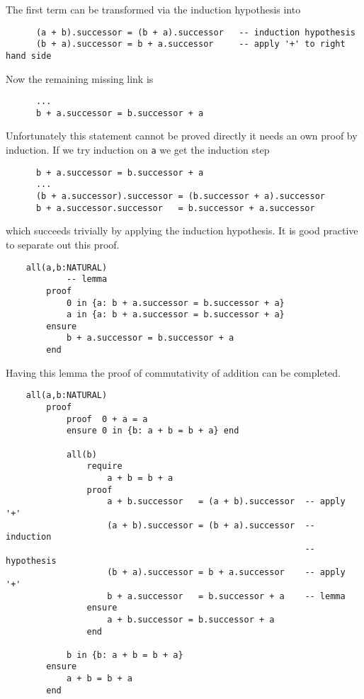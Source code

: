 The first term can be transformed via the induction hypothesis into
\begin{lstlisting}
      (a + b).successor = (b + a).successor   -- induction hypothesis
      (b + a).successor = b + a.successor     -- apply '+' to right hand side
\end{lstlisting}

Now the remaining missing link is

\begin{lstlisting}
      ...
      b + a.successor = b.successor + a
\end{lstlisting}

Unfortunately this statement cannot be proved directly it needs an own proof
by induction. If we try induction on \lstinline!a! we get the induction step
\begin{lstlisting}
      b + a.successor = b.successor + a
      ...
      (b + a.successor).successor = (b.successor + a).successor
      b + a.successor.successor   = b.successor + a.successor
\end{lstlisting}
which succeeds trivially by applying the induction hypothesis. It is good
practive to separate out this proof.

\begin{lstlisting}
    all(a,b:NATURAL)
            -- lemma
        proof
            0 in {a: b + a.successor = b.successor + a}
            a in {a: b + a.successor = b.successor + a}
        ensure
            b + a.successor = b.successor + a
        end
\end{lstlisting}

Having this lemma the proof of commutativity of addition can be completed.

\begin{lstlisting}
    all(a,b:NATURAL)
        proof
            proof  0 + a = a
            ensure 0 in {b: a + b = b + a} end

            all(b)
                require
                    a + b = b + a
                proof
                    a + b.successor   = (a + b).successor  -- apply '+'
                    (a + b).successor = (b + a).successor  -- induction
                                                           --  hypothesis
                    (b + a).successor = b + a.successor    -- apply '+'
                    b + a.successor   = b.successor + a    -- lemma
                ensure
                    a + b.successor = b.successor + a
                end

            b in {b: a + b = b + a}
        ensure
            a + b = b + a
        end
\end{lstlisting}

